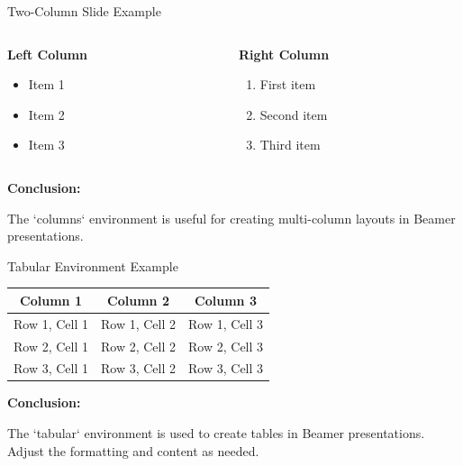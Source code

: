 \documentclass[aspectratio=169]{beamer}
\begin{document}
\begin{frame}{Two-Column Slide Example}
  \begin{columns}[T] %
    \begin{column}{0.47\textwidth}
      \textbf{Left Column}

      \begin{itemize}
        \item Item 1
        \item Item 2
        \item Item 3
      \end{itemize}
    \end{column}

    \begin{column}{0.47\textwidth}
      \textbf{Right Column}

      \begin{enumerate}
        \item First item
        \item Second item
        \item Third item
      \end{enumerate}
    \end{column}
  \end{columns}

  \vspace{3em} %

  \textbf{Conclusion:}

  The `columns` environment is useful for creating multi-column layouts in Beamer presentations.
\end{frame}

\begin{frame}{Tabular Environment Example}
  \begin{tabular}{|c|c|c|}
    \hline
    \textbf{Column 1} & \textbf{Column 2} & \textbf{Column 3} \\
    \hline
    Row 1, Cell 1 & Row 1, Cell 2 & Row 1, Cell 3 \\
    \hline
    Row 2, Cell 1 & Row 2, Cell 2 & Row 2, Cell 3 \\
    \hline
    Row 3, Cell 1 & Row 3, Cell 2 & Row 3, Cell 3 \\
    \hline
  \end{tabular}

  \vspace{1em}

  \textbf{Conclusion:}

  The `tabular` environment is used to create tables in Beamer presentations. Adjust the formatting and content as needed.
\end{frame}
\end{document}

